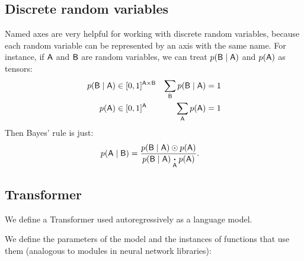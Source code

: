\documentclass{article}
\begin{document}
\subsection{Discrete random variables}

Named axes are very helpful for working with discrete random variables, because each random variable can be represented by an axis with the same name. For instance, if $\mathsf{A}$ and $\mathsf{B}$ are random variables, we can treat $p(\mathsf{B} \mid \mathsf{A})$ and $p(\mathsf{A})$ as tensors:
\begin{align*}
p(\mathsf{B} \mid \mathsf{A}) &\in [0, 1]^{\mathsf{A} \times \mathsf{B}} & \sum\limits_{\mathsf{B}} p(\mathsf{B}\mid \mathsf{A}) &= 1 \\
p(\mathsf{A}) &\in [0, 1]^{\mathsf{A}} & \sum\limits_{\mathsf{A}} p(\mathsf{A}) &= 1
\end{align*}
Then Bayes' rule is just:
\begin{align*}
p(\mathsf{A} \mid \mathsf{B}) &= \frac{p(\mathsf{B} \mid \mathsf{A}) \odot p(\mathsf{A})}{p(\mathsf{B} \mid \mathsf{A}) \mathbin{\mathop{\boldsymbol\cdot}\limits_{\mathsf{A}}} p(\mathsf{A})}.
\end{align*}

\subsection{Transformer}
\label{sec:transformer}

We define a Transformer used autoregressively as a language model.

We define the parameters of the model and the instances of functions that use them (analogous to modules in neural network libraries):
\end{document}
